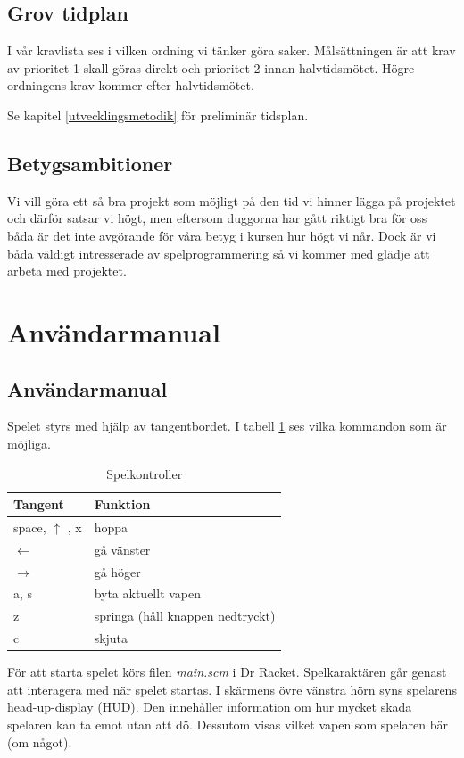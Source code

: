 \documentclass{scrartcl}
\begin{document}
\subsection{Grov tidplan}
I vår kravlista ses i vilken ordning vi tänker göra saker. Målsättningen är att krav av prioritet 1 skall göras direkt och prioritet 2 innan halvtidsmötet. Högre ordningens krav kommer efter halvtidsmötet.

Se kapitel \ref{utvecklingsmetodik} för preliminär tidsplan.

\subsection{Betygsambitioner}
Vi vill göra ett så bra projekt som möjligt på den tid vi hinner lägga på projektet och därför satsar vi högt, men eftersom duggorna har gått riktigt bra för oss båda är det inte avgörande för våra betyg i kursen hur högt vi når. Dock är vi båda väldigt intresserade av spelprogrammering så vi kommer med glädje att arbeta med projektet.

\section{Användarmanual}
\subsection{Användarmanual}

Spelet styrs med hjälp av tangentbordet. I tabell \ref{kontroller} ses vilka kommandon som är möjliga. 

\begin{table}[ht]
\caption{Spelkontroller}\label{kontroller}
\centering
    \begin{tabular}{ll}
    \toprule
    \textbf{Tangent}  & \textbf{Funktion} \\
    \midrule
    space, $\uparrow$ , x & hoppa \\
    $\leftarrow$  & gå vänster \\
    $\rightarrow$ & gå höger \\
    a, s     & byta aktuellt vapen \\
    z        & springa (håll knappen nedtryckt)\\
    c        & skjuta \\
    \bottomrule
    \end{tabular}
\end{table}

För att starta spelet körs filen \textsl{main.scm} i Dr Racket. Spelkaraktären går genast att interagera med när spelet startas. I skärmens övre vänstra hörn syns spelarens head-up-display (HUD). Den innehåller information om hur mycket skada spelaren kan ta emot utan att dö. Dessutom visas vilket vapen som spelaren bär (om något). 
\end{document}
